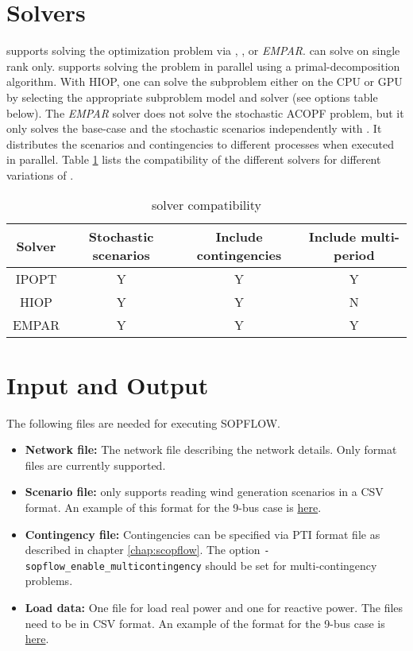 \section{Solvers}
\sopflow supports solving the optimization problem via \ipopt, \hiop, or \emph{EMPAR}. \ipopt can solve \sopflow on single rank only. \hiop supports solving the problem in parallel using a primal-decomposition algorithm. With HIOP, one can solve the subproblem either on the CPU or GPU by selecting the appropriate subproblem model and solver (see options table below).  The \emph{EMPAR} solver does not solve the stochastic ACOPF problem, but it only solves the base-case and the stochastic scenarios independently with \opflow. It distributes the scenarios and contingencies to different processes when executed in parallel. Table \ref{tab:sopflow_solvers} lists the compatibility of the different solvers for different variations of \sopflow.

\begin{center}
\begin{table}[!htbp]
    \centering
    \caption{\sopflow solver compatibility}
    \begin{tabular}{|c|c|c|c|}
      \hline
      \textbf{Solver} & \textbf{Stochastic scenarios} & \textbf{Include contingencies} & \textbf{Include multi-period} \\
      \hline
      IPOPT   & Y & Y & Y \\ \hline
      HIOP & Y & Y  & N \\ \hline
      EMPAR  & Y & Y  & Y \\ \hline
    \end{tabular}
    \label{tab:sopflow_solvers}
\end{table}
\end{center}


\section{Input and Output}
The following files are needed for executing SOPFLOW.
\begin{itemize}
    \item \textbf{Network file:} The network file describing the network details. Only \matpower format files are currently supported.
    \item \textbf{Scenario file:} \sopflow only supports reading wind generation scenarios in a CSV format. An example of this format for the 9-bus case is \href{https://gitlab.pnnl.gov/exasgd/frameworks/exago/-/tree/master/datafiles/case9/scenarios_9bus.csv}{here}.
    \item \textbf{Contingency file:} Contingencies can be specified via PTI format file as described in chapter \ref{chap:scopflow}. The option \lstinline{-sopflow_enable_multicontingency} should be set for multi-contingency problems.
    \item \textbf{Load data:} One file for load real power and one for reactive power. The files need to be in CSV format. An example of the format for the 9-bus case is \href{https://gitlab.pnnl.gov/exasgd/frameworks/exago/-/tree/master/datafiles/case9}{here}.
\end{itemize}

